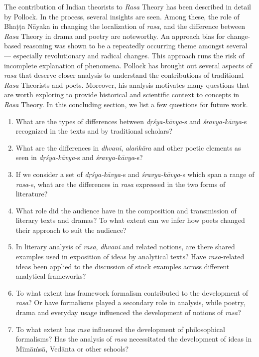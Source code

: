 The contribution of Indian theorists to \textsl{Rasa} Theory has been described in detail by Pollock. In the process, several insights are seen. Among these, the role of Bhaṭṭa Nāyaka in changing the localization of \textsl{rasa}, and the difference between \textsl{Rasa} Theory in drama and poetry are noteworthy. An approach bias for change-based reasoning was shown to be a repeatedly occurring theme amongst several  --- especially revolutionary and radical changes. This approach runs the risk of incomplete explanation of phenomena. Pollock has brought out several aspects of \textsl{rasa} that deserve closer analysis to understand the contributions of traditional \textsl{Rasa} Theorists and poets. Moreover, his analysis motivates many questions that are worth exploring to provide historical and scientific context to concepts in \textsl{Rasa} Theory. In this concluding section, we list a few questions for future work. 

\begin{enumerate}
\itemsep=1pt
\item What are the types of differences between \textsl{dṛśya-kāvya}-s and \textsl{śravya-kāvya}-s recognized in the texts and by traditional scholars?
\item What are the differences in \textsl{dhvani}, \textsl{alaṅkāra} and other poetic elements as seen in \textsl{dṛśya-kāvya}-s and \textsl{śravya-kāvya}-s?
\item If we consider a set of \textsl{dṛśya-kāvya}-s and \textsl{śravya-kāvya}-s which span a range of \textsl{rasa}-s, what are the differences in \textsl{rasa} expressed in the two forms of literature?
\item What role did the audience have in the composition and transmission of literary texts and dramas? To what extent can we infer how poets changed their approach to suit the audience? 
\item In literary analysis of \textsl{rasa}, \textsl{dhvani} and related notions, are there shared examples used in exposition of ideas by analytical texts? Have \textsl{rasa}-related ideas been applied to the discussion of stock examples across different analytical frameworks?
\item To what extent has framework formalism contributed to the development of \textsl{rasa}? Or have formalisms played a secondary role in analysis, while poetry, drama and everyday usage influenced the development of notions of \textsl{rasa}? 
\item To what extent has \textsl{rasa} influenced the development of philosophical formalisms? Has the analysis of \textsl{rasa} necessitated the development of ideas in Mīmāṁsā, Vedānta or other schools?
\end{enumerate}

